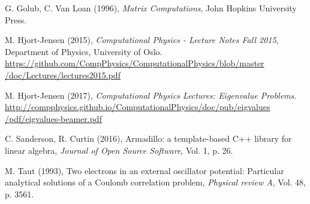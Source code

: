 \documentclass[12pt, a4paper]{article}
\begin{document}
\begin{thebibliography}{40}

 G. Golub, C. Van Loan (1996), \textit{Matrix Computations}, John Hopkins University 
Press. 

 M. Hjort-Jensen (2015), \textit{Computational Physics - Lecture Notes Fall 2015}, 
Department of Physics, University of Oslo. \\ 
\href{https://github.com/CompPhysics/ComputationalPhysics/blob/master/doc/Lectures/lectures2015.pdf}
{https://github.com/CompPhysics/ComputationalPhysics/blob/master\\/doc/Lectures/lectures2015.pdf}

 M. Hjort-Jensen (2017), \textit{Computational Physics Lectures: 
Eigenvalue Problems}. 
\href{http://compphysics.github.io/ComputationalPhysics/doc/pub/eigvalues/pdf/eigvalues-beamer.pdf}
{http://compphysics.github.io/ComputationalPhysics/doc/pub/eigvalues\\/pdf/eigvalues-beamer.pdf}

 C. Sanderson, R. Curtin (2016), Armadillo: a template-based C++ library for linear 
algebra, \textit{Journal of Open Source Software}, Vol. 1, p. 26.  

 M. Taut (1993), Two electrons in an external oscillator potential: Particular analytical 
solutions of a Coulomb correlation problem, \textit{Physical review A}, Vol. 48, p. 3561. 

\end{thebibliography}
\end{document}
